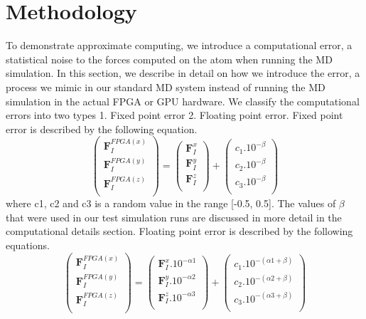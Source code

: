 \documentclass[aps,pre,twocolumn,showpacs,preprintnumbers,amsmath,amssymb]{revtex4-1}
\begin{document}
\section{Methodology}
To demonstrate approximate computing, we introduce a computational error, a statistical noise to the forces computed on the atom when running the MD simulation. In this section, we describe in detail on how we introduce the error, a process we mimic in our standard MD system instead of running the MD simulation in the actual FPGA or GPU hardware. We classify the computational errors into two types 1. Fixed point error 2. Floating point error. 
Fixed point error is described by the following equation. 
\begin{equation}
\begin{pmatrix}
\textbf{F}_{I}^{FPGA(x)}\\ 
\textbf{F}_{I}^{FPGA(y)}\\ 
\textbf{F}_{I}^{FPGA(z)}\\ 

\end{pmatrix} = 
\begin{pmatrix}
\textbf{F}_{I}^{x}\\ 
\textbf{F}_{I}^{y}\\ 
\textbf{F}_{I}^{z}\\ 

\end{pmatrix} + 
\begin{pmatrix}
c_{1}.10^{-\beta }\\ 
c_{2}.10^{-\beta }\\ 
c_{3}.10^{-\beta }\\ 

\end{pmatrix}
\end{equation}
where c1, c2 and c3 is a random value in the range [-0.5, 0.5]. The values of \(\beta\) that were used in our test simulation runs are discussed in more detail in the computational details section.  
Floating point error is described by the following equations.
\begin{equation}
\begin{pmatrix}
\textbf{F}_{I}^{FPGA(x)}\\ 
\textbf{F}_{I}^{FPGA(y)}\\ 
\textbf{F}_{I}^{FPGA(z)}\\ 

\end{pmatrix} = 
\begin{pmatrix}
\textbf{F}_{I}^{x}.10^{-\alpha1}\\ 
\textbf{F}_{I}^{y}.10^{-\alpha2}\\ 
\textbf{F}_{I}^{z}.10^{-\alpha3}\\ 

\end{pmatrix} + 
\begin{pmatrix}
c_{1}.10^{-(\alpha1+\beta)}\\ 
c_{2}.10^{-(\alpha2+\beta)}\\ 
c_{3}.10^{-(\alpha3+\beta)}\\ 

\end{pmatrix}
\end{equation}
\end{document}
